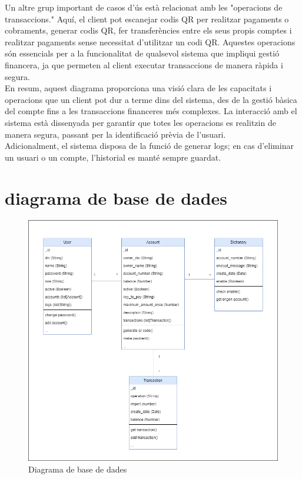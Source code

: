 \documentclass[a4paper,12pt,twoside]{ThesisStyle}
\begin{document}
Un altre grup important de casos d'ús està relacionat amb les "operacions de transaccions." Aquí, el client pot escanejar codis QR per realitzar pagaments o cobraments, generar codis QR, fer transferències entre els seus propis comptes i realitzar pagaments sense necessitat d'utilitzar un codi QR. Aquestes operacions són essencials per a la funcionalitat de qualsevol sistema que impliqui gestió financera, ja que permeten al client executar transaccions de manera ràpida i segura.\\

En resum, aquest diagrama proporciona una visió clara de les capacitats i operacions que un client pot dur a terme dins del sistema, des de la gestió bàsica del compte fins a les transaccions financeres més complexes. La interacció amb el sistema està dissenyada per garantir que totes les operacions es realitzin de manera segura, passant per la identificació prèvia de l'usuari.\\


Adicionalment, el sistema disposa de la funció de generar logs; en cas d'eliminar un usuari o un compte, l'historial es manté sempre guardat.


\clearpage
\section{diagrama de base de dades}
\label{sec: diagrama de base de dades}


\begin{figure}[h]
    \centering
    \includegraphics[width=1\textwidth]{imatges/diagrama base dades.png}
    \caption{ Diagrama de base de dades }
    \label{fig: Diagrama de base de dades}
\end{figure}
\end{document}
